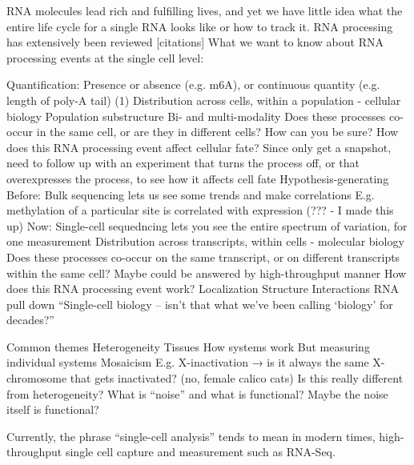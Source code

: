 RNA molecules lead rich and fulfilling lives, and yet we have little idea what the entire life cycle for a single RNA looks like or how to track it.
RNA processing has extensively been reviewed [citations]
What we want to know about RNA processing events at the single cell level:


Quantification: Presence or absence (e.g. m6A), or continuous quantity (e.g. length of poly-A tail)
(1) Distribution across cells, within a population - cellular biology
Population substructure 
Bi- and multi-modality
Does these processes co-occur in the same cell, or are they in different cells?
How can you be sure?
How does this RNA processing event affect cellular fate?
Since only get a snapshot, need to follow up with an experiment that turns the process off, or that overexpresses the process, to see how it affects cell fate
Hypothesis-generating
Before:
Bulk sequencing lets us see some trends and make correlations
E.g. methylation of a particular site is correlated with expression (??? - I made this up)
Now:
Single-cell sequedncing lets you see the entire spectrum of variation, for one measurement
Distribution across transcripts, within cells - molecular biology
Does these processes co-occur on the same transcript, or on different transcripts within the same cell?
Maybe could be answered by high-throughput manner
How does this RNA processing event work?
Localization
Structure
Interactions
RNA pull down
``Single-cell biology -- isn't that what we've been calling ‘biology' for decades?'' \cite{Symmons2016-xn}

Common themes
Heterogeneity
Tissues
How systems work
But measuring individual systems
Mosaicism
E.g. X-inactivation → is it always the same X-chromosome that gets inactivated? (no, female calico cats)
Is this really different from heterogeneity?
What is ``noise'' and what is functional? Maybe the noise itself is functional?

Currently, the phrase ``single-cell analysis'' tends to mean in modern times, high-throughput single cell capture and measurement such as RNA-Seq.


